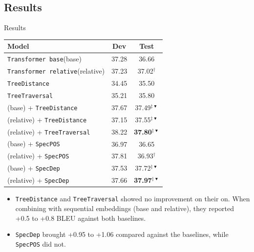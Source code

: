 \documentclass{beamer}
\def\transformerbase{\texttt{Transformer base}\xspace}
\def\transformerrel{\texttt{Transformer relative}\xspace}
\def\TreeDistance{\texttt{TreeDistance}\xspace}
\def\TreeTraversal{\texttt{TreeTraversal}\xspace}
\def\SpecPOS{\texttt{SpecPOS}\xspace}
\def\SpecDep{\texttt{SpecDep}\xspace}
\begin{document}
\subsection{Results}

\begin{frame}{Results}
\begin{table}[t]
    \small
    \begin{center}
    \begin{tabular}{lcc}
        \textbf{Model}        	                            & \textbf{Dev}	& \textbf{Test}	\\
        \hline
        \transformerbase (base)    					        & 37.28 & 36.66 \\
        \transformerrel	(relative)				            & 37.23 & 37.02$^{\dag}$ \\
        \hline
        \TreeDistance				                        & 34.45 & 35.50 \\
        \TreeTraversal					                    & 35.21 & 35.80 \\
        (base) + \TreeDistance      					    & 37.67 & 37.49$^{\ddag\blacktriangledown}$ \\
        (relative) + \TreeDistance      			        & 37.15 & 37.55$^{\ddag\blacktriangledown}$ \\
        (relative) + \TreeTraversal				            & 38.22 & \textbf{37.80}$^{\ddag\blacktriangledown}$ \\
        \hline
        (base) + \SpecPOS						& 36.97 & 36.65 \\
        (relative) + \SpecPOS			& 37.81 & 36.93$^{\dag}$ \\
        (base) + \SpecDep		& 37.53 &  37.72$^{\ddag\blacktriangledown}$ \\
        (relative) + \SpecDep		& 37.66 & \textbf{37.97}$^{\ddag\blacktriangledown}$  \\
    \end{tabular}
    \end{center}
\end{table}
\begin{itemize}
    \item \TreeDistance and \TreeTraversal showed no improvement on their on. When combining with sequential embeddings (base and relative), they reported +0.5 to +0.8 BLEU against both baselines.
    \item \SpecDep brought +0.95 to +1.06 compared against the baselines, while \SpecPOS did not.
\end{itemize}
\end{frame}
\end{document}

